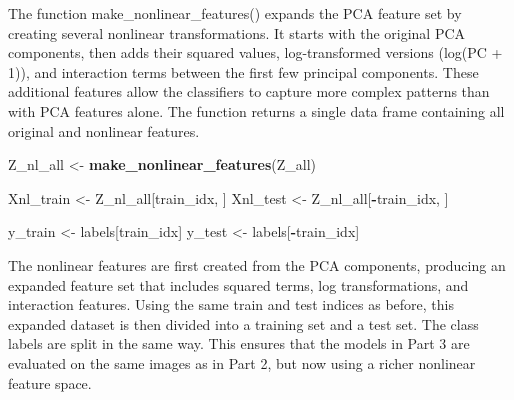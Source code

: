 \documentclass[
]{article}
\newenvironment{Shaded}{\begin{snugshade}}{\end{snugshade}}
\newcommand{\FunctionTok}[1]{\textcolor[rgb]{0.13,0.29,0.53}{\textbf{#1}}}
\newcommand{\NormalTok}[1]{#1}
\newcommand{\OtherTok}[1]{\textcolor[rgb]{0.56,0.35,0.01}{#1}}
\newcommand{\SpecialCharTok}[1]{\textcolor[rgb]{0.81,0.36,0.00}{\textbf{#1}}}
\begin{document}
The function make\_nonlinear\_features() expands the PCA feature set by
creating several nonlinear transformations. It starts with the original
PCA components, then adds their squared values, log-transformed versions
(log(\textbar PC\textbar{} + 1)), and interaction terms between the
first few principal components. These additional features allow the
classifiers to capture more complex patterns than with PCA features
alone. The function returns a single data frame containing all original
and nonlinear features.

\begin{Shaded}
\begin{Highlighting}[]
\NormalTok{Z\_nl\_all }\OtherTok{\textless{}{-}} \FunctionTok{make\_nonlinear\_features}\NormalTok{(Z\_all)}

\NormalTok{Xnl\_train }\OtherTok{\textless{}{-}}\NormalTok{ Z\_nl\_all[train\_idx, ]}
\NormalTok{Xnl\_test  }\OtherTok{\textless{}{-}}\NormalTok{ Z\_nl\_all[}\SpecialCharTok{{-}}\NormalTok{train\_idx, ]}

\NormalTok{y\_train }\OtherTok{\textless{}{-}}\NormalTok{ labels[train\_idx]}
\NormalTok{y\_test  }\OtherTok{\textless{}{-}}\NormalTok{ labels[}\SpecialCharTok{{-}}\NormalTok{train\_idx]}
\end{Highlighting}
\end{Shaded}

The nonlinear features are first created from the PCA components,
producing an expanded feature set that includes squared terms, log
transformations, and interaction features. Using the same train and test
indices as before, this expanded dataset is then divided into a training
set and a test set. The class labels are split in the same way. This
ensures that the models in Part 3 are evaluated on the same images as in
Part 2, but now using a richer nonlinear feature space.
\end{document}
